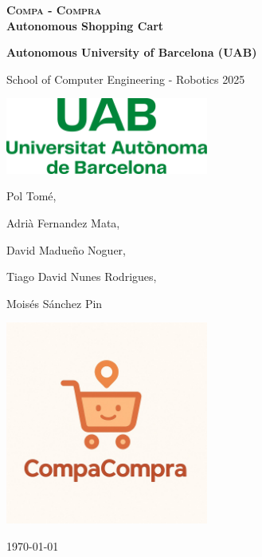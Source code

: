 \documentclass[a4paper,11pt]{article}
\begin{document}
\begin{titlepage}
    \centering
    \vspace*{2cm}

    {\Huge\bfseries \textsc{Compa - Compra}  \\ \Large{Autonomous Shopping Cart} \par}

    \vspace{1cm}
    {\Large\bfseries Autonomous University of Barcelona (UAB)

    School of Computer Engineering - Robotics 2025 \par}

    \vspace{0.5cm}

    \includegraphics[width=0.5\textwidth]{Logo_uab.png} %

    \vspace{0.5cm}
    {\large Pol Tomé,

    Adrià Fernandez Mata,

    David Madueño Noguer,

    Tiago David Nunes Rodrigues,

    Moisés Sánchez Pin
     \par}

    \vspace{1cm}
    \includegraphics[width=0.5\textwidth]{compacompra_logo.jpg} %

    \vfill
    {\Large \today} %

\end{titlepage}
\end{document}
